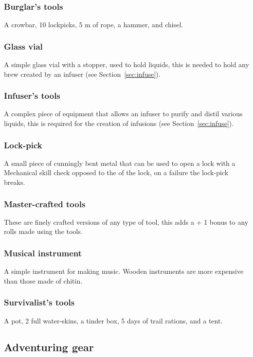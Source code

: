 \documentclass[a4paper,11pt,oneside]{book}
\newcommand{\textlf}[1]{\textbf{\titlecap{#1}}}
\begin{document}
\subsubsection{Burglar's tools}
A crowbar, 10 lockpicks, 5 m of rope, a hammer, and chisel.

\subsubsection{Glass vial}
A simple glass vial with a stopper, used to hold liquids, this is needed to hold any brew created by an infuser (see Section~\ref{sec:infuse}).

\subsubsection{Infuser's tools}
A complex piece of equipment that allows an infuser to purify and distil various liquids, this is required for the creation of infusions (see Section~\ref{sec:infuse}).

\subsubsection{Lock-pick}
A small piece of cunningly bent metal that can be used to open a lock with a Mechanical skill check opposed to the \textlf{difficulty} of the lock, on a failure the lock-pick breaks.

\subsubsection{Master-crafted tools}
These are finely crafted versions of any type of tool, this adds a + 1 bonus to any rolls made using the tools.

\subsubsection{Musical instrument}
A simple instrument for making music. Wooden instruments are more expensive than those made of chitin.

\subsubsection{Survivalist's tools}
A pot, 2 full water-skins, a tinder box, 5 days of trail rations, and a tent.

\subsection{Adventuring gear}
\end{document}

